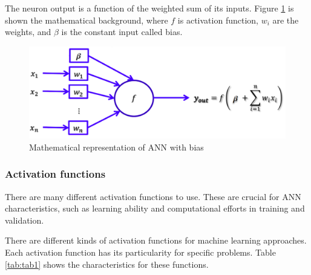 The neuron output is a function of the weighted sum of its inputs. Figure \ref{fig:ann_weight} is shown the mathematical background, where $f$ is activation function, $w_i$ are the weights, and $\beta$ is the constant input called bias.


\begin{figure}[H]
\centering
\includegraphics[width=\columnwidth]{imagens/math_ann_bias.png}
\caption{Mathematical representation of ANN with bias \cite{lecture}}
\label{fig:ann_weight}
\end{figure}


\subsubsection{Activation functions}
There are many different activation functions to use. These are crucial for ANN characteristics, such as learning ability and computational efforts in training and validation.

There are different kinds of activation functions for machine learning approaches. Each activation function has its particularity for specific problems. Table \ref{tab:tab1} shows the characteristics for these functions. 


